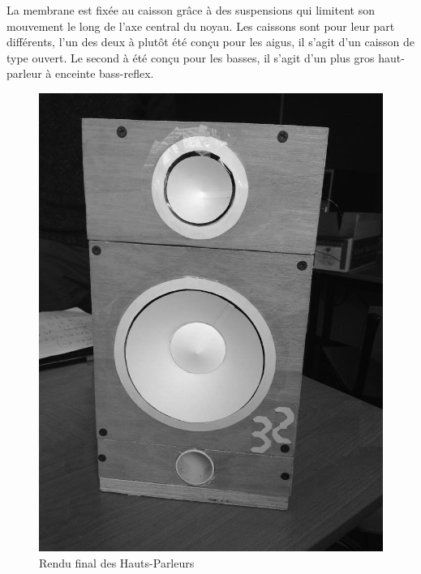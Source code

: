 La membrane est fixée au caisson grâce à des suspensions qui limitent son mouvement le long de l'axe central du noyau. Les caissons sont pour leur part différents, l'un des deux à plutôt été conçu pour les aigus, il s'agit d'un caisson de type ouvert. Le second à été conçu pour les basses, il s'agit d'un plus gros haut-parleur à enceinte bass-reflex. 


\begin{figure}	
\begin{center}
\includegraphics[scale=0.5]{img/PhotoHP} 
\end{center}
\caption{Rendu final des Hauts-Parleurs}		
\label{fig:PhotoHP}		
\end{figure}




